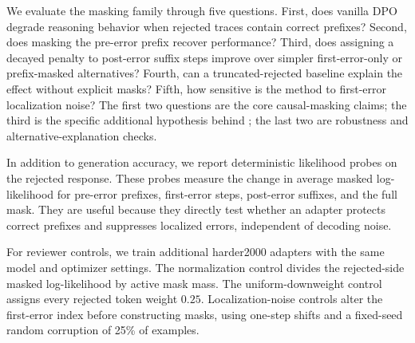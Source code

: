 We evaluate the masking family through five questions. First, does vanilla DPO degrade reasoning behavior when rejected traces contain correct prefixes? Second, does masking the pre-error prefix recover performance? Third, does assigning a decayed penalty to post-error suffix steps improve over simpler first-error-only or prefix-masked alternatives? Fourth, can a truncated-rejected baseline explain the effect without explicit masks? Fifth, how sensitive is the method to first-error localization noise? The first two questions are the core causal-masking claims; the third is the specific additional hypothesis behind \cmdpo{}; the last two are robustness and alternative-explanation checks.

In addition to generation accuracy, we report deterministic likelihood probes on the rejected response. These probes measure the change in average masked log-likelihood for pre-error prefixes, first-error steps, post-error suffixes, and the full \cmdpo{} mask. They are useful because they directly test whether an adapter protects correct prefixes and suppresses localized errors, independent of decoding noise.

For reviewer controls, we train additional harder2000 adapters with the same model and optimizer settings. The normalization control divides the rejected-side masked log-likelihood by active mask mass. The uniform-downweight control assigns every rejected token weight $0.25$. Localization-noise controls alter the first-error index before constructing masks, using one-step shifts and a fixed-seed random corruption of 25\% of examples.
